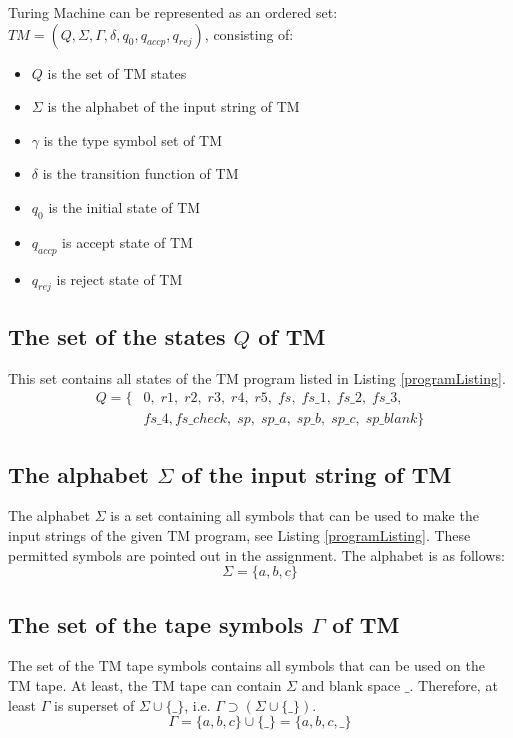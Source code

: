 \documentclass[12pt, a4paper]{report}
\begin{document}
Turing Machine can be represented as an ordered set: $ TM = (Q, \Sigma, \Gamma, \delta, q_{0}, q_{accp}, q_{rej}) $, consisting of: 
			\begin{itemize}
				\item $Q$  is the set of TM states
				\item $\Sigma$  is the alphabet of the input string of TM
				\item $\gamma$  is the type symbol set of TM
				\item $\delta$  is the transition function of TM
				\item $q_{0}$ is the initial state of TM
				\item $q_{accp}$ is accept state of TM
				\item $q_{rej}$  is reject state of TM
				\end{itemize}


	\subsection{The set of the states $Q$ of TM}
	This set contains all states of the TM program listed in Listing \ref{programListing}.
		\begin{equation}
		\begin{aligned}
		\label{eq:Q}
			Q = \{
			& 0, \; r1, \; r2, \; r3, \; r4, \; r5, \; fs, \; fs\_1, \; fs\_2, \; fs\_3, \; \\
			& fs\_4, fs\_check, \; sp, \; sp\_a, \; sp\_b, \; sp\_c, \; sp\_blank\}
		\end{aligned}
		\end{equation}
	\subsection{The alphabet $ \Sigma $ of the input string of TM}
		The alphabet $ \Sigma $ is a set containing all symbols that can be used to make the input strings of the given TM program, see Listing \ref{programListing}. These permitted symbols are pointed out in the assignment. The alphabet is as follows:
		\begin{equation}
			\Sigma = \{a, b, c\}
		\end{equation}
% 
	\subsection{The set of the tape symbols $ \Gamma $ of TM}
	The set of the TM tape symbols contains all symbols that can be used on the TM tape. At least, the TM tape can contain $ \Sigma $ and blank space $ \_ $. Therefore, at least $ \Gamma $ is superset of $ \Sigma \cup \{\_\} $, i.e. $ \Gamma \supset (\Sigma \cup \{\_\}) $.
		\begin{equation} \label{eq:Gamma}
			\Gamma = \{ a, b, c \} \cup \{ \_ \} = \{a, b, c, \_ \}
		\end{equation}
	
\end{document}
